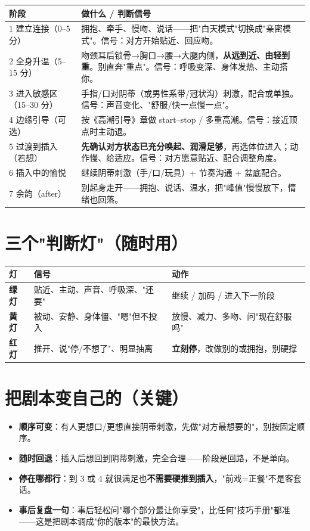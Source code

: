 \begin{tabularx}{\textwidth}{l X}
\toprule
\textbf{阶段} & \textbf{做什么 / 判断信号} \\
\midrule
1 建立连接（0--5 分） & 拥抱、牵手、慢吻、说话——把"白天模式"切换成"亲密模式"。信号：对方开始贴近、回应吻。 \\
2 全身升温（5--15 分） & 吻颈耳后锁骨→胸口→腰→大腿内侧，\textbf{从远到近、由轻到重}。别直奔"重点"。信号：呼吸变深、身体发热、主动搭你。 \\
3 进入敏感区（15--30 分） & 手指/口对阴蒂（或男性系带/冠状沟）刺激，配合或单独。信号：声音变化、"舒服/快一点慢一点"。 \\
4 边缘引导（可选） & 按《高潮引导》章做 start--stop / 多重高潮。信号：接近顶点时主动退。 \\
5 过渡到插入（若想） & \textbf{先确认对方状态已充分唤起、润滑足够}，再选体位进入；动作慢、给适应。信号：对方愿意贴近、配合调整角度。 \\
6 插入中的愉悦 & 继续阴蒂刺激（手/口/玩具）+ 节奏沟通 + 盆底配合。 \\
7 余韵（after） & 别起身走开——拥抱、说话、温水，把"峰值"慢慢放下，情绪也回落。 \\
\bottomrule
\end{tabularx}

\section{三个"判断灯"（随时用）}
\begin{tabularx}{\textwidth}{l X X}
\toprule
\textbf{灯} & \textbf{信号} & \textbf{动作} \\
\midrule
\textbf{绿灯} & 贴近、主动、声音、呼吸深、"还要" & 继续 / 加码 / 进入下一阶段 \\
\textbf{黄灯} & 被动、安静、身体僵、"嗯"但不投入 & 放慢、减力、多吻、问"现在舒服吗" \\
\textbf{红灯} & 推开、说"停/不想了"、明显抽离 & \textbf{立刻停}，改做别的或拥抱，别硬撑 \\
\bottomrule
\end{tabularx}

\section{把剧本变自己的（关键）}
\begin{itemize}[leftmargin=2em,itemsep=0.3em]
  \item \textbf{顺序可变}：有人更想口/更想直接阴蒂刺激，先做"对方最想要的"，别按固定顺序。
  \item \textbf{随时回退}：插入后想回到阴蒂刺激，完全合理——阶段是回路，不是单向。
  \item \textbf{停在哪都行}：到 3 或 4 就很满足也\textbf{不需要硬推到插入}，"前戏=正餐"不是客套话。
  \item \textbf{事后复盘一句}：事后轻松问"哪个部分最让你享受"，比任何"技巧手册"都准——这是把剧本调成"你的版本"的最快方法。
\end{itemize}

